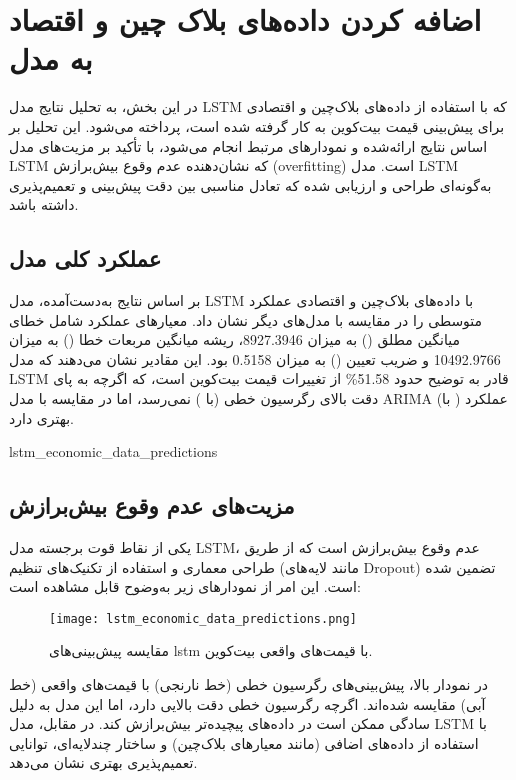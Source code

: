 \section{اضافه کردن داده‌های بلاک چین و اقتصاد به مدل}



در این بخش، به تحلیل نتایج مدل LSTM که با استفاده از داده‌های بلاک‌چین و اقتصادی برای پیش‌بینی قیمت بیت‌کوین به کار گرفته شده است، پرداخته می‌شود. این تحلیل بر اساس نتایج ارائه‌شده و نمودارهای مرتبط انجام می‌شود، با تأکید بر مزیت‌های مدل LSTM که نشان‌دهنده عدم وقوع بیش‌برازش (overfitting) است. مدل LSTM به‌گونه‌ای طراحی و ارزیابی شده که تعادل مناسبی بین دقت پیش‌بینی و تعمیم‌پذیری داشته باشد.



\subsection*{عملکرد کلی مدل}
بر اساس نتایج به‌دست‌آمده، مدل LSTM با داده‌های بلاک‌چین و اقتصادی عملکرد متوسطی را در مقایسه با مدل‌های دیگر نشان داد. معیارهای عملکرد شامل خطای میانگین مطلق () به میزان 8927.3946، ریشه میانگین مربعات خطا () به میزان 10492.9766 و ضریب تعیین () به میزان 0.5158 بود. این مقادیر نشان می‌دهند که مدل LSTM قادر به توضیح حدود 51.58\% از تغییرات قیمت بیت‌کوین است، که اگرچه به پای دقت بالای رگرسیون خطی (با ) نمی‌رسد، اما در مقایسه با مدل ARIMA (با ) عملکرد بهتری دارد.

lstm_economic_data_predictions

\subsection*{مزیت‌های عدم وقوع بیش‌برازش}
یکی از نقاط قوت برجسته مدل LSTM، عدم وقوع بیش‌برازش است که از طریق طراحی معماری و استفاده از تکنیک‌های تنظیم (مانند لایه‌های Dropout) تضمین شده است. این امر از نمودارهای زیر به‌وضوح قابل مشاهده است:

\begin{figure}[h]
	\centering
	\texttt{[image: lstm\_economic\_data\_predictions.png]}
	\caption{مقایسه پیش‌بینی‌های lstm با قیمت‌های واقعی بیت‌کوین.}
	\label{fig:linear_regression}
\end{figure}

در نمودار بالا، پیش‌بینی‌های رگرسیون خطی (خط نارنجی) با قیمت‌های واقعی (خط آبی) مقایسه شده‌اند. اگرچه رگرسیون خطی دقت بالایی دارد، اما این مدل به دلیل سادگی ممکن است در داده‌های پیچیده‌تر بیش‌برازش کند. در مقابل، مدل LSTM با استفاده از داده‌های اضافی (مانند معیارهای بلاک‌چین) و ساختار چندلایه‌ای، توانایی تعمیم‌پذیری بهتری نشان می‌دهد.

